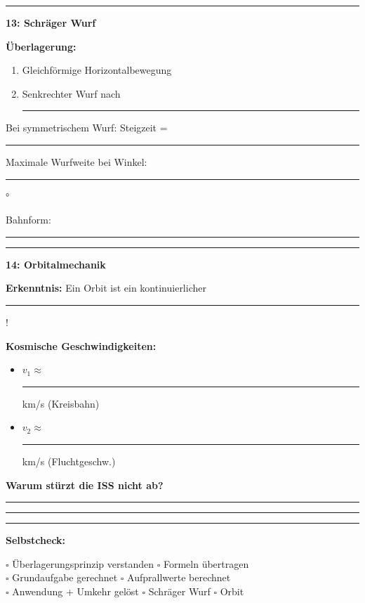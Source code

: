 \documentclass[10pt, a4paper]{article}
\newcommand{\fachfarbe}{physik}
\newcommand{\luecke}[1]{\rule[-2pt]{#1}{0.5pt}}
\newcommand{\schritt}[1]{%
    \vspace{4pt}
    \noindent\textcolor{\fachfarbe}{\rule{0.3cm}{0.3cm}}\hspace{4pt}\textbf{\textcolor{\fachfarbe}{#1}}
    \vspace{2pt}
}
\begin{document}
\begin{multicols}{2}
\vspace{8pt}


\schritt{13: Schräger Wurf}

\begin{merkbox}
\textbf{Überlagerung:}
\begin{enumerate}[leftmargin=1.5em]
    \item Gleichförmige Horizontalbewegung
    \item Senkrechter Wurf nach \luecke{1.5cm}
\end{enumerate}

\vspace{4pt}
Bei symmetrischem Wurf: Steigzeit = \luecke{2cm}

\vspace{4pt}
Maximale Wurfweite bei Winkel: \luecke{1.5cm}°

\vspace{4pt}
Bahnform: \luecke{2.5cm}
\end{merkbox}

\vspace{6pt}

\schritt{14: Orbitalmechanik}

\begin{merkbox}
\textbf{Erkenntnis:} Ein Orbit ist ein kontinuierlicher \luecke{3cm}!

\vspace{6pt}
\textbf{Kosmische Geschwindigkeiten:}
\begin{itemize}[leftmargin=1em]
    \item $v_1 \approx$ \luecke{1.2cm} km/s \small(Kreisbahn)
    \item $v_2 \approx$ \luecke{1.2cm} km/s \small(Fluchtgeschw.)
\end{itemize}

\vspace{6pt}
\textbf{Warum stürzt die ISS nicht ab?}

\vspace{2pt}
\luecke{6cm}

\luecke{6cm}
\end{merkbox}

\vspace{8pt}


\hrule
\vspace{4pt}

{\small\textbf{Selbstcheck:}}

\vspace{2pt}
{\footnotesize
$\square$ Überlagerungsprinzip verstanden \quad
$\square$ Formeln übertragen \\
$\square$ Grundaufgabe gerechnet \quad
$\square$ Aufprallwerte berechnet \\
$\square$ Anwendung + Umkehr gelöst \quad
$\square$ Schräger Wurf \quad
$\square$ Orbit
}

\end{multicols}
\end{document}
